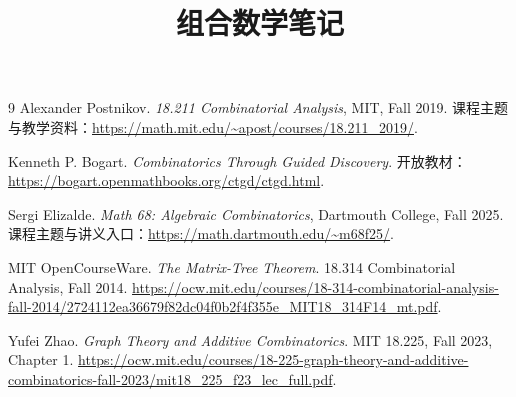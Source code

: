 \documentclass[UTF8,12pt,a4paper,fontset=fandol]{ctexbook}
\title{组合数学笔记}
\author{}
\date{}
\begin{document}
\frontmatter %

\maketitle
\tableofcontents


\mainmatter


















\appendix



\backmatter
\begin{thebibliography}{9}
Alexander Postnikov. \textit{18.211 Combinatorial Analysis}, MIT, Fall 2019. 课程主题与教学资料：\url{https://math.mit.edu/~apost/courses/18.211_2019/}.

Kenneth P. Bogart. \textit{Combinatorics Through Guided Discovery}. 开放教材：\url{https://bogart.openmathbooks.org/ctgd/ctgd.html}.

Sergi Elizalde. \textit{Math 68: Algebraic Combinatorics}, Dartmouth College, Fall 2025. 课程主题与讲义入口：\url{https://math.dartmouth.edu/~m68f25/}.

MIT OpenCourseWare. \textit{The Matrix-Tree Theorem}. 18.314 Combinatorial Analysis, Fall 2014. \url{https://ocw.mit.edu/courses/18-314-combinatorial-analysis-fall-2014/2724112ea36679f82dc04f0b2f4f355e_MIT18_314F14_mt.pdf}.

Yufei Zhao. \textit{Graph Theory and Additive Combinatorics}. MIT 18.225, Fall 2023, Chapter 1. \url{https://ocw.mit.edu/courses/18-225-graph-theory-and-additive-combinatorics-fall-2023/mit18_225_f23_lec_full.pdf}.

\end{thebibliography}
\end{document}
